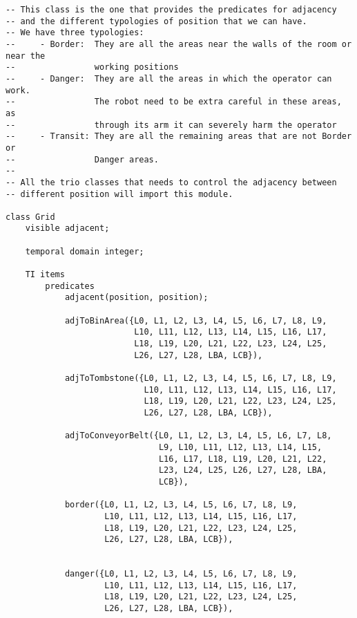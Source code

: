 \begin{lstlisting}[fontadjust, mathescape, frame=single] 
-- This class is the one that provides the predicates for adjacency
-- and the different typologies of position that we can have.
-- We have three typologies:
--     - Border:  They are all the areas near the walls of the room or near the
--                working positions
--     - Danger:  They are all the areas in which the operator can work. 
--                The robot need to be extra careful in these areas, as
--                through its arm it can severely harm the operator
--     - Transit: They are all the remaining areas that are not Border or
--                Danger areas.
-- 
-- All the trio classes that needs to control the adjacency between 
-- different position will import this module.

class Grid
    visible adjacent;

    temporal domain integer;

    TI items
        predicates 
            adjacent(position, position);
                    
            adjToBinArea({L0, L1, L2, L3, L4, L5, L6, L7, L8, L9,
                          L10, L11, L12, L13, L14, L15, L16, L17,
                          L18, L19, L20, L21, L22, L23, L24, L25,
                          L26, L27, L28, LBA, LCB}),
                          
            adjToTombstone({L0, L1, L2, L3, L4, L5, L6, L7, L8, L9,
                            L10, L11, L12, L13, L14, L15, L16, L17,
                            L18, L19, L20, L21, L22, L23, L24, L25,
                            L26, L27, L28, LBA, LCB}),
                            
            adjToConveyorBelt({L0, L1, L2, L3, L4, L5, L6, L7, L8,
                               L9, L10, L11, L12, L13, L14, L15, 
                               L16, L17, L18, L19, L20, L21, L22,
                               L23, L24, L25, L26, L27, L28, LBA,
                               LCB}),
                               
            border({L0, L1, L2, L3, L4, L5, L6, L7, L8, L9,
                    L10, L11, L12, L13, L14, L15, L16, L17,
                    L18, L19, L20, L21, L22, L23, L24, L25,
                    L26, L27, L28, LBA, LCB}),
             
                    
            danger({L0, L1, L2, L3, L4, L5, L6, L7, L8, L9,
                    L10, L11, L12, L13, L14, L15, L16, L17,
                    L18, L19, L20, L21, L22, L23, L24, L25,
                    L26, L27, L28, LBA, LCB}),
                    

\end{lstlisting}
